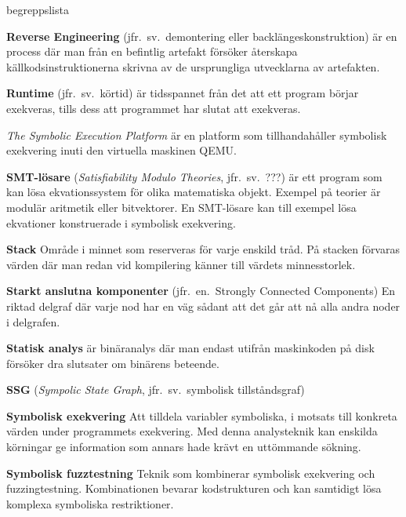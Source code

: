 \begin{labeling}{begreppslista}
    \item [\textbf{Reverse Engineering}] (jfr.\ sv.\ demontering eller
          backlängeskonstruktion) är en process där man från en
    befintlig artefakt försöker återskapa källkodsinstruktionerna
    skrivna av de ursprungliga utvecklarna av artefakten.

    \item [\textbf{Runtime}] (jfr.\ sv.\ körtid) är tidsspannet från
    det att ett program börjar exekveras, tills dess att
    programmet har slutat att exekveras.

    \item [\textbf{\stoe}] \emph{The Symbolic Execution Platform} är
    en platform som tillhandahåller symbolisk exekvering inuti den
    virtuella maskinen QEMU.\@

    \item [\textbf{SMT-lösare}] (\emph{Satisfiability Modulo
              Theories}, jfr.\ sv.\ ???) är ett program som kan lösa
    ekvationssystem för olika matematiska objekt.  Exempel på
    teorier är modulär aritmetik eller bitvektorer. En SMT-lösare
    kan till exempel lösa ekvationer konstruerade i symbolisk
    exekvering.

    \item [\textbf{Stack}] Område i minnet som reserveras för varje
    enskild tråd.  På stacken förvaras värden där man redan vid
    kompilering känner till värdets minnesstorlek.

    \item [\textbf{Starkt anslutna komponenter}] (jfr.\ en.\ Strongly
          Connected Components) En riktad delgraf där varje nod har en
    väg sådant att det går att nå alla andra noder i delgrafen.

    \item [\textbf{Statisk analys}] är binäranalys där man endast
    utifrån maskinkoden på disk försöker dra slutsater om binärens
    beteende.

    \item [\textbf{SSG}] (\emph{Sympolic State Graph},
          jfr.\ sv.\ symbolisk tillståndsgraf)

    \item [\textbf{Symbolisk exekvering}] Att tilldela variabler
    symboliska, i motsats till konkreta värden under programmets
    exekvering. Med denna analysteknik kan enskilda körningar ge
    information som annars hade krävt en uttömmande sökning.

    \item [\textbf{Symbolisk fuzztestning}] Teknik som kombinerar
    symbolisk exekvering och fuzzingtestning. Kombinationen
    bevarar kodstrukturen och kan samtidigt lösa komplexa
    symboliska restriktioner.


\end{labeling}
